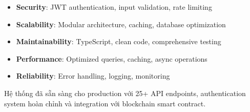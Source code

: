 \documentclass[12pt,a4paper]{article}
\begin{document}
\begin{itemize}
    \item \textbf{Security}: JWT authentication, input validation, rate limiting
    \item \textbf{Scalability}: Modular architecture, caching, database optimization
    \item \textbf{Maintainability}: TypeScript, clean code, comprehensive testing
    \item \textbf{Performance}: Optimized queries, caching, async operations
    \item \textbf{Reliability}: Error handling, logging, monitoring
\end{itemize}

Hệ thống đã sẵn sàng cho production với 25+ API endpoints, authentication system hoàn chỉnh và integration với blockchain smart contract.
\end{document}
